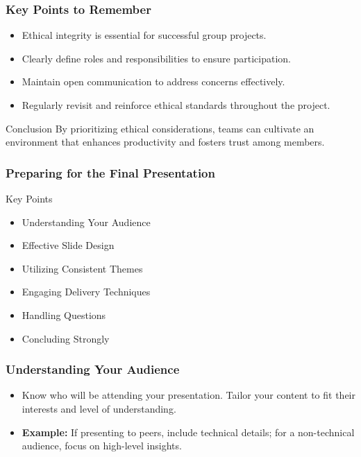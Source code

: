 \documentclass[aspectratio=169]{beamer}
\begin{document}
\begin{frame}[fragile]
    \frametitle{Key Points to Remember}
    \begin{itemize}
        \item Ethical integrity is essential for successful group projects.
        \item Clearly define roles and responsibilities to ensure participation.
        \item Maintain open communication to address concerns effectively.
        \item Regularly revisit and reinforce ethical standards throughout the project.
    \end{itemize}
    \begin{block}{Conclusion}
        By prioritizing ethical considerations, teams can cultivate an environment that enhances productivity and fosters trust among members.
    \end{block}
\end{frame}

\begin{frame}[fragile]
    \frametitle{Preparing for the Final Presentation}
    \begin{block}{Key Points}
        \begin{itemize}
            \item Understanding Your Audience
            \item Effective Slide Design
            \item Utilizing Consistent Themes
            \item Engaging Delivery Techniques
            \item Handling Questions
            \item Concluding Strongly
        \end{itemize}
    \end{block}
\end{frame}

\begin{frame}[fragile]
    \frametitle{Understanding Your Audience}
    \begin{itemize}
        \item Know who will be attending your presentation. Tailor your content to fit their interests and level of understanding.
        \item \textbf{Example:} If presenting to peers, include technical details; for a non-technical audience, focus on high-level insights.
    \end{itemize}
\end{frame}
\end{document}
